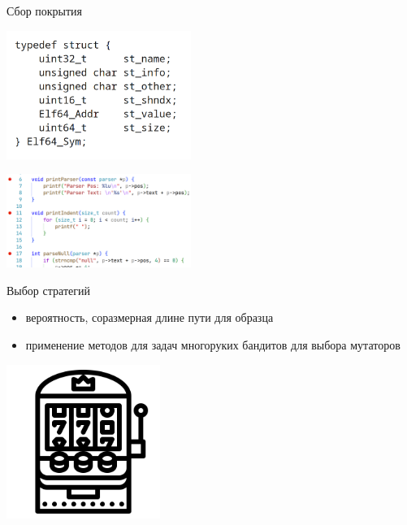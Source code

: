 \documentclass[hyperref={unicode=true}, 12pt]{beamer}
\begin{document}
	\begin{frame}[t]{Сбор покрытия}
		\begin{minipage}{0.5\textwidth}
			
			\vspace{1.5cm}
			
			\includegraphics[width=6cm]{elf-sym.png}
			
		\end{minipage}\begin{minipage}{0.5\textwidth}
			
			\vspace{1.5cm}
			
			\includegraphics[width=6cm]{breakpoints.png}
		\end{minipage}
	\end{frame}

	\begin{frame}[t]{Выбор стратегий}
		\begin{minipage}{0.5\textwidth}
			
			\vspace{1.1cm}
			
			\begin{itemize}
				\item вероятность, соразмерная длине пути для образца
				
				\item применение методов для задач многоруких бандитов для выбора мутаторов
			\end{itemize}
		
			
		\end{minipage}\begin{minipage}{0.5\textwidth}
			
			\vspace{1.1cm}
			\includegraphics[width=5cm]{bandit.png}
		\end{minipage}
	\end{frame}
	
\end{document}

